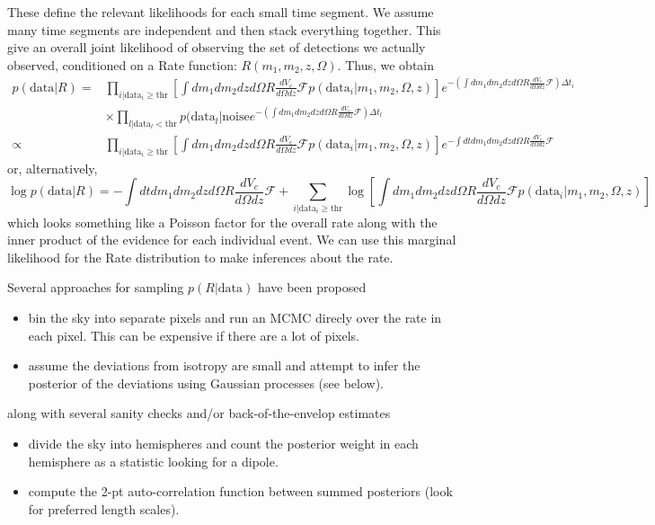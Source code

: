 \documentclass{article}
\begin{document}
These define the relevant likelihoods for each small time segment.
We assume many time segments are independent and then stack everything together.
This give an overall joint likelihood of observing the set of detections we actually observed, conditioned on a Rate function: $R(m_1, m_2, z, \Omega)$.
Thus, we obtain
\begin{align}
    p(\mathrm{data}|R) = & \prod\limits_{i|\mathrm{data}_i\geq\mathrm{thr}} \left[ \int dm_1 dm_2 dz d\Omega R \frac{dV_c}{d\Omega dz} \mathcal{F} p(\mathrm{data}_i|m_1, m_2, \Omega, z) \right] e^{-\left(\int dm_1 dm_2 dz d\Omega R \frac{dV_c}{d\Omega dz} \mathcal{F}\right) \Delta t_i} \\
                         & \times \prod\limits_{l|\mathrm{data}_l<\mathrm{thr}} p(\mathrm{data}_l|\mathrm{noise} e^{-\left(\int dm_1 dm_2 dz d\Omega R \frac{dV_c}{d\Omega dz} \mathcal{F}\right) \Delta t_l} \\
                 \propto & \prod\limits_{i|\mathrm{data}_i\geq\mathrm{thr}} \left[ \int dm_1 dm_2 dz d\Omega R \frac{dV_c}{d\Omega dz} \mathcal{F} p(\mathrm{data}_i|m_1, m_2, \Omega, z) \right] e^{-\int dt dm_1 dm_2 dz d\Omega R \frac{dV_c}{d\Omega dz} \mathcal{F}}
\end{align}
or, alternatively,
\begin{equation}
    \log p(\mathrm{data}|R) = - \int dt dm_1 dm_2 dz d\Omega R \frac{dV_c}{d\Omega dz} \mathcal{F} + \sum\limits_{i|\mathrm{data}_i\geq\mathrm{thr}} \log \left[ \int dm_1 dm_2 dz d\Omega R \frac{dV_c}{d\Omega dz} \mathcal{F} p(\mathrm{data}_i|m_1, m_2, \Omega, z) \right]
\end{equation}
which looks something like a Poisson factor for the overall rate along with the inner product of the evidence for each individual event.
We can use this marginal likelihood for the Rate distribution to make inferences about the rate.

Several approaches for sampling $p(R|\mathrm{data})$ have been proposed
\begin{itemize}
    \item bin the sky into separate pixels and run an MCMC direcly over the rate in each pixel. This can be expensive if there are a lot of pixels.
    \item assume the deviations from isotropy are small and attempt to infer the posterior of the deviations using Gaussian processes (see below).
\end{itemize}
along with several sanity checks and/or back-of-the-envelop estimates
\begin{itemize}
    \item divide the sky into hemispheres and count the posterior weight in each hemisphere as a statistic looking for a dipole.
    \item compute the 2-pt auto-correlation function between summed posteriors (look for preferred length scales).
\end{itemize}
\end{document}
